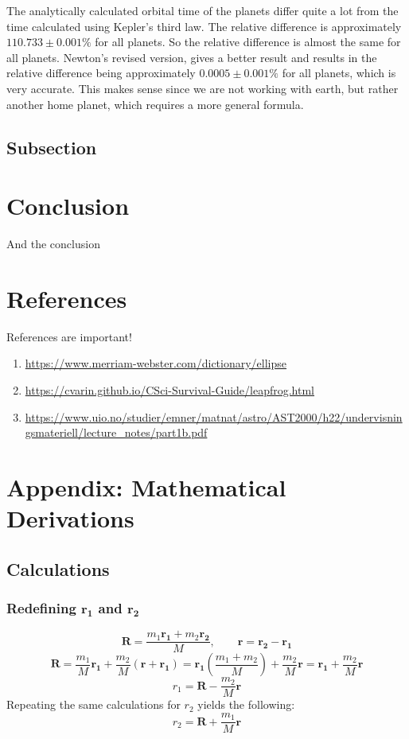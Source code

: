 \documentclass[reprint,english,notitlepage]{revtex4-2}
\begin{document}
The analytically calculated orbital time of the planets differ quite a lot from the time calculated using Kepler's third law.
The relative difference is approximately $110.733 \pm 0.001\%$ for all planets.
So the relative difference is almost the same for all planets.
Newton's revised version, gives a better result and results in the relative difference being approximately $0.0005 \pm 0.001\%$ for all planets, which is very accurate.
This makes sense since we are not working with earth, but rather another home planet, which requires a more general formula.

	\subsection{Subsection}

\section{Conclusion}
And the conclusion

\section{References}
References are important!
\begin{enumerate}
	\item \url{https://www.merriam-webster.com/dictionary/ellipse}
	\item \url{https://cvarin.github.io/CSci-Survival-Guide/leapfrog.html}
	\item \url{https://www.uio.no/studier/emner/matnat/astro/AST2000/h22/undervisningsmateriell/lecture_notes/part1b.pdf}
\end{enumerate}

\newpage
\section{Appendix: Mathematical Derivations}
	\subsection{Calculations}
		\subsubsection{Redefining $ \mathbf{r_1} $ and $ \mathbf{r_2} $}\label{r1r2 calc}
			\[
			\mathbf{R} = \frac{m_1 \mathbf{r_1} + m_2 \mathbf{r_2}}{M}, \qquad \mathbf{r} = \mathbf{r_2} - \mathbf{r_1}
			\]
			\[
			\mathbf{R} = \frac{m_1}{M}\mathbf{r_1} + \frac{m_2}{M} \left( \mathbf{r} + \mathbf{r_1} \right) = \mathbf{r_1} \left( \frac{m_1 + m_2}{M} \right) + \frac{m_2}{M} \mathbf{r} = \mathbf{r_1} + \frac{m_2}{M} \mathbf{r}
			\]
			\[
			r_1 = \mathbf{R} - \frac{m_2}{M}\mathbf{r}
			\]
			Repeating the same calculations for $ r_2 $ yields the following: 
			\[
			r_2 = \mathbf{R} + \frac{m_1}{M} \mathbf{r}
			\]
\end{document}
